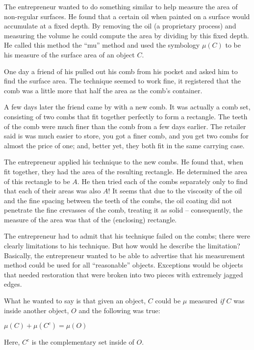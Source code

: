 \documentclass{article}
\begin{document}
The entrepreneur wanted to do something similar to help measure the area of 
non-regular surfaces. He found that a 
certain oil when painted on a surface would accumulate at a fixed depth. By 
removing the oil (a proprietary process) and measuring the volume he could 
compute the area by dividing by this fixed depth. He called this method the 
``mu'' method and used the symbology $\mu(C)$ to be his measure of the surface 
area of an object $C$.

One day a friend of his pulled out his comb from his pocket and asked him to 
find the surface area. The technique seemed to work fine, it registered that 
the comb was a little more that half the area as the comb's container.

A few days later the friend came by with a new comb. It was actually a comb 
set, consisting of two combs that fit together perfectly to form a rectangle.
The teeth of the comb were much finer than the comb from a few days earlier. 
The retailer said is was much easier to store, you got a finer comb, and you 
get two combs for almost the price of one; and, better yet, they both 
fit in the same carrying case.

The entrepreneur applied his technique to the new combs. 
He found that, when fit together, they had the area of the resulting rectangle.
He determined the area of this rectangle to be $A$. He then tried each of the 
combs separately only to find that each of their areas was also $A$!
It seems that due to the viscosity of the oil and the fine spacing between the 
teeth of the combs, the oil coating did not penetrate the fine crevasses of the 
comb, treating it as solid -- consequently, the measure of the area was that of the (enclosing) rectangle.


The entrepreneur had to admit that his technique failed on the combs; 
there were clearly limitations to his technique. 
But how would he describe the limitation? Basically, the entrepreneur wanted to 
be able to advertise that his measurement method could be used for all ``reasonable'' objects. 
Exceptions would be objects that needed restoration that were broken into two pieces with extremely jagged edges.

What he wanted to say is that given an object, $C$ could be $\mu$ measured 
{\em if} $C$ was inside another object, $O$ and the following was true:

$\mu(C) + \mu(C^c) = \mu(O)$

Here, $C^c$ is the complementary set inside of $O$.
\end{document}
